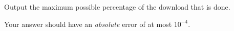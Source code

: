 
    Output the maximum possible percentage of the download that is done.

    Your answer should have an \emph{absolute} error of at most $10^{-4}$.
